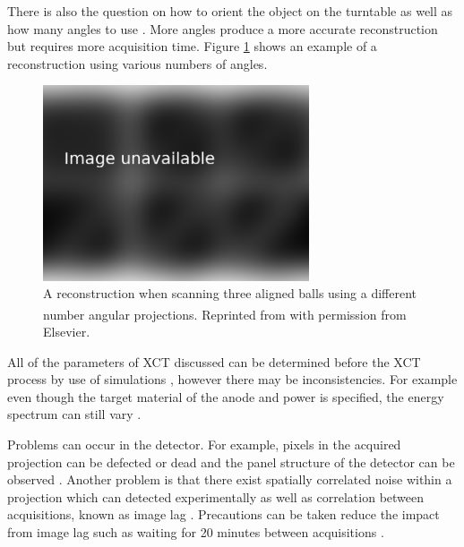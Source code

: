 There is also the question on how to orient the object on the turntable \citep{corcoran2016observations} as well as how many angles to use \citep{kruth2011computed}. More angles produce a more accurate reconstruction but requires more acquisition time. Figure \ref{fig:literature_angles} shows an example of a reconstruction using various numbers of angles.

\begin{figure}
  \centering
  \includegraphics[width=0.7\textwidth]{../figures/literatureReview/literature_angles.png}
  \caption{A reconstruction when scanning three aligned balls using a different number angular projections. Reprinted from \cite{kruth2011computed}\textsuperscript{\textcopyright} with permission from Elsevier.}
  \label{fig:literature_angles}
\end{figure}

All of the parameters of XCT discussed can be determined before the XCT process by use of simulations \citep{reisinger2011simulation, reiter2011simulation}, however there may be inconsistencies. For example even though the target material of the anode and power is specified, the energy spectrum can still vary \citep{stumbo2004direct}.

Problems can occur in the detector. For example, pixels in the acquired projection can be defected or dead \citep{brettschneider2014spatial} and the panel structure of the detector can be observed \citep{yang2009evaluation}. Another problem is that there exist spatially correlated noise within a projection which can detected experimentally \citep{sun2016characterisation} as well as correlation between acquisitions, known as image lag \citep{yang2009evaluation}. Precautions can be taken reduce the impact from image lag such as waiting for 20 minutes between acquisitions \citep{yang2010noise}.

